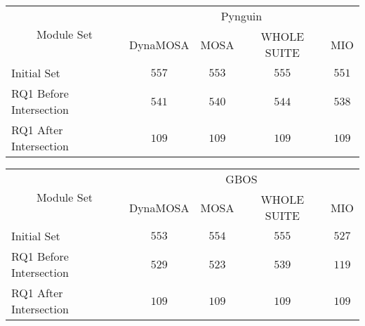 
\begin{tabular}{lcccc}\toprule
    \multicolumn{1}{c}{\multirow{2}{*}{Module Set}} & \multicolumn{4}{c}{Pynguin}                \\ \cmidrule(lr){2-5}
    \multicolumn{1}{c}{}                          & DynaMOSA & MOSA    & WHOLE SUITE & MIO     \\ \midrule
    Initial Set                                     & \(557\)  & \(553\) & \(555\)     & \(551\) \\
    RQ1 Before Intersection                         & \(541\)  & \(540\) & \(544\)     & \(538\) \\
    RQ1 After Intersection                          & \(109\)  & \(109\) & \(109\)     & \(109\) \\ 
    \bottomrule
  \end{tabular}
  \centering 
  \begin{tabular}{lcccc}\toprule
    \multicolumn{1}{c}{\multirow{2}{*}{Module Set}} & \multicolumn{4}{c}{GBOS}                   \\ \cmidrule(lr){2-5}
    \multicolumn{1}{c}{}                          & DynaMOSA & MOSA    & WHOLE SUITE & MIO     \\ \midrule
    Initial Set                                     & \(553\)  & \(554\) & \(555\)     & \(527\) \\
    RQ1 Before Intersection                         & \(529\)  & \(523\) & \(539\)     & \(119\) \\
    RQ1 After Intersection                          & \(109\)  & \(109\) & \(109\)     & \(109\) \\ 
    \bottomrule
\end{tabular}
